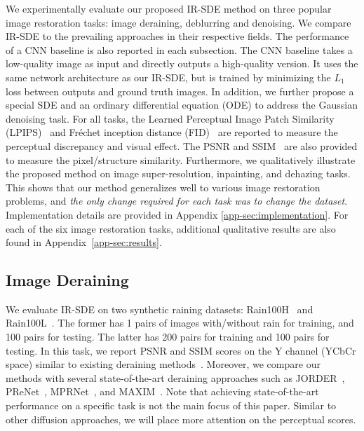 \documentclass{article}
\theoremstyle{plain}
\theoremstyle{definition}
\theoremstyle{remark}
\begin{document}
We experimentally evaluate our proposed IR-SDE method on three popular image restoration tasks: image deraining, deblurring and denoising. 
We compare IR-SDE to the prevailing approaches in their respective fields. The performance of a CNN baseline is also reported in each subsection. The CNN baseline takes a low-quality image as input and directly outputs a high-quality version. It uses the same network architecture as our IR-SDE, but is trained by minimizing the $L_1$ loss between outputs and ground truth images. In addition, we further propose a special SDE and an ordinary differential equation (ODE) to address the Gaussian denoising task. For all tasks, the Learned Perceptual Image Patch Similarity (LPIPS)~\cite{zhang2018unreasonable} and Fr\'{e}chet inception distance (FID)~\cite{heusel2017gans} are reported to measure the perceptual discrepancy and visual effect. The PSNR and SSIM~\cite{wang2004image} are also provided to measure the pixel/structure similarity. Furthermore, we qualitatively illustrate the proposed method on image super-resolution, inpainting, and dehazing tasks. This shows that our method generalizes well to various image restoration problems, and \emph{the only change required for each task was to change the dataset}. Implementation details are provided in Appendix \ref{app-sec:implementation}. For each of the six image restoration tasks, additional qualitative results are also found in Appendix~\ref{app-sec:results}.





\subsection{Image Deraining}

We evaluate IR-SDE on two synthetic raining datasets: Rain100H~\cite{yang2017deep} and Rain100L~\cite{yang2017deep}. The former has 1 pairs of images with/without rain for training, and 100 pairs for testing. The latter has 200 pairs for training and 100 pairs for testing. In this task, we report PSNR and SSIM scores on the Y channel (YCbCr space) similar to existing deraining methods~\cite{ren2019progressive,zamir2021multi}. Moreover, we compare our methods with several state-of-the-art deraining approaches such as JORDER~\cite{yang2019joint}, PReNet~\cite{ren2019progressive}, MPRNet~\cite{zamir2021multi}, and MAXIM~\cite{tu2022maxim}. 
Note that achieving state-of-the-art performance on a specific task is not the main focus of this paper. Similar to other diffusion approaches, we will place more attention on the perceptual scores. 
\end{document}
